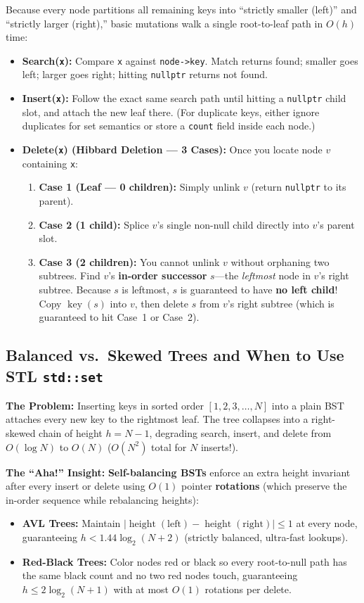 \documentclass[11pt,a4paper]{article}
\theoremstyle{definition}
\newcommand{\painbeat}{\textbf{\color{accentamber}The Problem:} }
\newcommand{\ahabeat}{\textbf{\color{accentteal}The ``Aha!'' Insight:} }
\begin{document}
Because every node partitions all remaining keys into ``strictly smaller (left)'' and ``strictly larger (right),'' basic mutations walk a single root-to-leaf path in $O(h)$ time:
\begin{itemize}
    \item \textbf{Search(\texttt{x}):} Compare \texttt{x} against \texttt{node->key}. Match returns found; smaller goes left; larger goes right; hitting \texttt{nullptr} returns not found.
    \item \textbf{Insert(\texttt{x}):} Follow the exact same search path until hitting a \texttt{nullptr} child slot, and attach the new leaf there. (For duplicate keys, either ignore duplicates for set semantics or store a \texttt{count} field inside each node.)
    \item \textbf{Delete(\texttt{x}) (Hibbard Deletion --- 3 Cases):} Once you locate node $v$ containing \texttt{x}:
    \begin{enumerate}[itemsep=2pt, topsep=2pt]
        \item \textbf{Case 1 (Leaf --- 0 children):} Simply unlink $v$ (return \texttt{nullptr} to its parent).
        \item \textbf{Case 2 (1 child):} Splice $v$'s single non-null child directly into $v$'s parent slot.
        \item \textbf{Case 3 (2 children):} You cannot unlink $v$ without orphaning two subtrees. Find $v$'s \textbf{in-order successor} $s$---the \emph{leftmost} node in $v$'s right subtree. Because $s$ is leftmost, $s$ is guaranteed to have \textbf{no left child}! Copy $\operatorname{key}(s)$ into $v$, then delete $s$ from $v$'s right subtree (which is guaranteed to hit Case~1 or Case~2).
    \end{enumerate}
\end{itemize}

\subsection{Balanced vs.\ Skewed Trees and When to Use STL \texttt{std::set}}

\painbeat Inserting keys in sorted order $[1, 2, 3, \dots, N]$ into a plain BST attaches every new key to the rightmost leaf. The tree collapses into a right-skewed chain of height $h = N - 1$, degrading search, insert, and delete from $O(\log N)$ to $O(N)$ ($O(N^2)$ total for $N$ inserts!).

\ahabeat \textbf{Self-balancing BSTs} enforce an extra height invariant after every insert or delete using $O(1)$ pointer \textbf{rotations} (which preserve the in-order sequence while rebalancing heights):
\begin{itemize}
    \item \textbf{AVL Trees:} Maintain $|\operatorname{height}(\text{left}) - \operatorname{height}(\text{right})| \le 1$ at every node, guaranteeing $h < 1.44 \log_2(N + 2)$ (strictly balanced, ultra-fast lookups).
    \item \textbf{Red-Black Trees:} Color nodes red or black so every root-to-null path has the same black count and no two red nodes touch, guaranteeing $h \le 2 \log_2(N + 1)$ with at most $O(1)$ rotations per delete.
\end{itemize}
\end{document}
